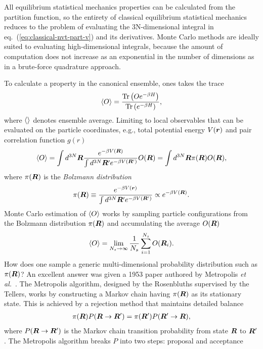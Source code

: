 All equilibrium statistical mechanics properties can be calculated from the partition function, so the entirety of classical equilibrium statistical mechanics reduces to the problem of evaluating the 3N-dimensional integral in eq.~(\ref{eq:classical-nvt-part-v}) and its derivatives. Monte Carlo methods are ideally suited to evaluating high-dimensional integrals, because the amount of computation does not increase as an exponential in the number of dimensions as in a brute-force quadrature approach.

To calculate a property in the canonical ensemble, ones takes the trace
\begin{align}
\braket{O} = \dfrac{\text{Tr}\left(Oe^{-\beta H}\right)}{\text{Tr}\left(e^{-\beta H}\right)},
\end{align}
where $\braket{}$ denotes ensemble average. Limiting to local observables that can be evaluated on the particle coordinates, e.g., total potential energy $V(\boldsymbol{r})$ and pair correlation function $g(r)$
\begin{align} \label{eq:int-obs}
\braket{O} = \int d^{3N}\boldsymbol{R} \dfrac{e^{-\beta V(\boldsymbol{R})}}{\int d^{3N}\boldsymbol{R}' e^{-\beta V(\boldsymbol{R}')}} O(\boldsymbol{R}) = \int d^{3N}\boldsymbol{R} \pi(\boldsymbol{R})O(\boldsymbol{R}),
\end{align}
where $\pi(\boldsymbol{R})$ is the \emph{Bolzmann distribution}
\begin{align} \label{eq:bolzmann-pi}
\pi(\boldsymbol{R}) \equiv \dfrac{e^{-\beta V(\boldsymbol{r})}}{\int d^{3N}\boldsymbol{R}' e^{-\beta V(\boldsymbol{R}')}} \propto e^{-\beta V(\boldsymbol{R})}.
\end{align}
Monte Carlo estimation of $\braket{O}$ works by sampling particle configurations from the Bolzmann distribution $\pi(\boldsymbol{R})$ and accumulating the average $O(\boldsymbol{R})$
\begin{align}
\braket{O} = \lim\limits_{N_s\rightarrow\infty} \frac{1}{N_s} \sum\limits_{i=1}^{N_s} O(\boldsymbol{R}_i).
\end{align}
How does one sample a generic multi-dimensional probability distribution such as $\pi(\boldsymbol{R})$?
An excellent answer was given a 1953 paper authored by Metropolis \textit{et al.}~\cite{Metropolis1953}. The Metropolis algorithm, designed by the Rosenbluths supervised by the Tellers, works by constructing a Markov chain having $\pi(\boldsymbol{R})$ as its stationary state. This is achieved by a rejection method that maintains detailed balance
\begin{align} \label{eq:detailed-balance}
\pi(\boldsymbol{R})P(\boldsymbol{R}\rightarrow\boldsymbol{R}')=\pi(\boldsymbol{R}')P(\boldsymbol{R}'\rightarrow\boldsymbol{R}),
\end{align}
where $P(\boldsymbol{R}\rightarrow\boldsymbol{R}')$ is the Markov chain transition probability from state $\boldsymbol{R}$ to $\boldsymbol{R}'$. The Metropolis algorithm breaks $P$ into two steps: proposal and acceptance
